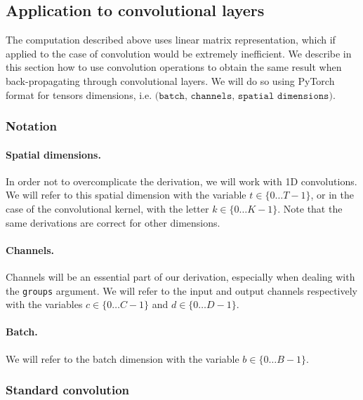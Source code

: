 \documentclass[11pt]{article}
\begin{document}
\subsection{Application to convolutional layers}
% 
The computation described above uses linear matrix representation, which
if applied to the case of convolution would be extremely inefficient. We describe in this
section how to use convolution operations to obtain the same result when
back-propagating through convolutional layers. 
We will do so using PyTorch format for tensors
dimensions, i.e. $\texttt{(batch, channels, spatial dimensions)}$.

\subsubsection{Notation}

\paragraph*{Spatial dimensions.}
In order not to overcomplicate the derivation, we will work with 1D
convolutions. We will refer to this spatial dimension with the variable $t
\in \{0 \hdots T - 1\}$, or in the case of the convolutional kernel, with the
letter $k \in \{0 \hdots K - 1\}$. Note that the same derivations are correct
for other dimensions.

\paragraph*{Channels.}
Channels will be an essential part of our derivation, especially when
dealing with the \verb?groups? argument. We will refer to the input and
output channels respectively with the variables $c \in \{0 \hdots C -1\}$ and
$d \in \{0 \hdots D - 1\}$.

\paragraph*{Batch.}
We will refer to the batch dimension with the variable $b \in \{0 \hdots B - 1\}$.

\subsubsection{Standard convolution}
\label{sec:convolution}
\end{document}
